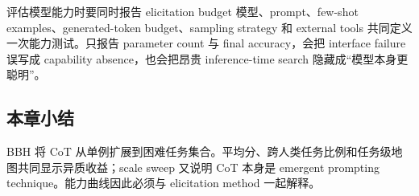 \begin{importantbox}{评估模型能力时要同时报告 elicitation budget}
模型、prompt、few-shot examples、generated-token budget、sampling strategy 和 external tools 共同定义一次能力测试。只报告 parameter count 与 final accuracy，会把 interface failure 误写成 capability absence，也会把昂贵 inference-time search 隐藏成“模型本身更聪明”。
\end{importantbox}

\subsection{本章小结}

BBH 将 CoT 从单例扩展到困难任务集合。平均分、跨人类任务比例和任务级地图共同显示异质收益；scale sweep 又说明 CoT 本身是 emergent prompting technique。能力曲线因此必须与 elicitation method 一起解释。

